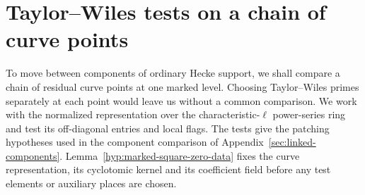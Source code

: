 \section{Taylor--Wiles tests on a chain of curve points}
\label{sec:marked-patching}
\hypertarget{source-ordinary-marked-patching}{}

To move between components of ordinary Hecke support, we shall compare a chain of
residual curve points at one marked level. Choosing Taylor--Wiles primes separately at
each point would leave us without a common comparison.
We work with the normalized representation over the
characteristic-\(\ell\) power-series ring and test its
off-diagonal entries and local flags. The tests give the
patching hypotheses used in the component comparison of
Appendix~\ref{sec:linked-components}. Lemma~\ref{hyp:marked-square-zero-data} fixes the curve representation, its cyclotomic kernel and its coefficient field before any test elements or auxiliary places are chosen.

